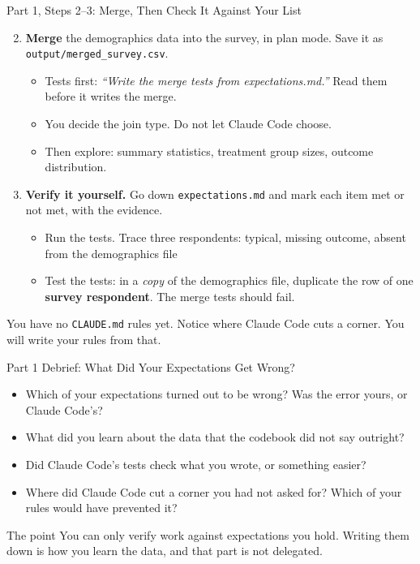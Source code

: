\documentclass[aspectratio=169, 11pt]{beamer}
\begin{document}
\begin{frame}{Part 1, Steps 2--3: Merge, Then Check It Against Your List}
  \small
  \begin{enumerate}
    \setcounter{enumi}{1}
    \item \textbf{Merge} the demographics data into the survey, in plan mode. Save it as \texttt{output/merged\_survey.csv}.
    \begin{itemize}
      \footnotesize
      \item Tests first: \textit{``Write the merge tests from expectations.md.''} Read them before it writes the merge.
      \item \alert{You decide the join type.} Do not let Claude Code choose.
      \item Then explore: summary statistics, treatment group sizes, outcome distribution.
    \end{itemize}

    \vspace{0.3em}
    \item \textbf{Verify it yourself.} Go down \texttt{expectations.md} and mark each item met or not met, with the evidence.
    \begin{itemize}
      \footnotesize
      \item Run the tests. Trace three respondents: typical, missing outcome, absent from the demographics file
      \item Test the tests: in a \textit{copy} of the demographics file, duplicate the row of one \textbf{survey respondent}. The merge tests should fail.
    \end{itemize}
  \end{enumerate}

  \vspace{0.3em}
  \alert{You have no \texttt{CLAUDE.md} rules yet.} Notice where Claude Code cuts a corner. You will write your rules from that.
\end{frame}

\begin{frame}{Part 1 Debrief: What Did Your Expectations Get Wrong?}
  \begin{itemize}
    \item Which of your expectations turned out to be wrong? Was the error yours, or Claude Code's?
    \item What did you learn about the data that the codebook did not say outright?
    \item Did Claude Code's tests check what you wrote, or something easier?
    \item Where did Claude Code cut a corner you had not asked for? Which of your rules would have prevented it?
  \end{itemize}

  \vspace{0.8em}
  \begin{block}{The point}
    You can only verify work against expectations you hold. Writing them down is how you learn the data, and that part is not delegated.
  \end{block}
\end{frame}
\end{document}
